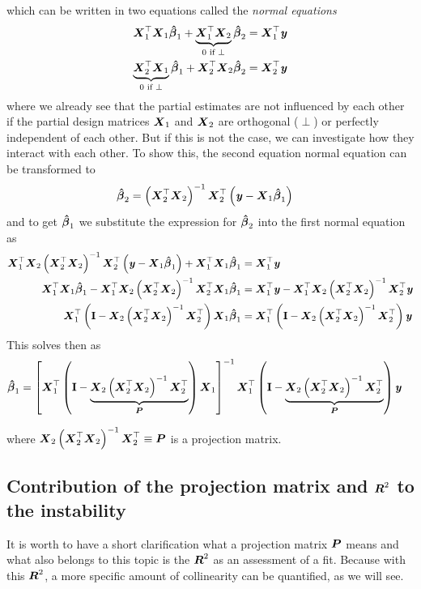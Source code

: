 \documentclass[11pt,a4paper,twoside]{book}\usepackage[]{graphicx}\usepackage[]{xcolor}
\begin{document}
which can be written in two equations called the \textit{normal equations}
\begin{align*}
\X_1^\top \X_1 \hbbeta_1+\underbrace{\X_1^\top \X_2}_{0\text{ if }\perp}\hbbeta_2 &= \X_1^\top \y\\
\underbrace{\X_2^\top \X_1}_{0\text{ if }\perp}\hbbeta_1+\X_2^\top \X_2\hbbeta_2&= \X_2^\top \y
\end{align*}
where we already see that the partial estimates are not influenced by each other if the partial design matrices $\X_1$ and $\X_2$ are orthogonal ($\perp$) or perfectly independent of each other. But if this is not the case, we can investigate how they interact with each other. To show this, the second equation normal equation can be transformed to
\begin{align*}
\hbbeta_2&= \left(\X_2^\top \X_2\right)^{-1}\X_2^\top\left(\y-\X_1\hbbeta_1\right)
\end{align*}
and to get $\hbbeta_1$ we substitute the expression for $\hbbeta_2$ into the first normal equation as
\begin{align*}
\X_1^\top \X_2\left(\X_2^\top \X_2\right)^{-1}\X_2^\top\left(\y-\X_1\hbbeta_1\right)+\X_1^\top \X_1\hbbeta_1&= \X_1^\top \y\\
\X_1^\top \X_1\hbbeta_1-\X_1^\top \X_2\left(\X_2^\top \X_2\right)^{-1}\X_2^\top\X_1\hbbeta_1&= \X_1^\top \y-\X_1^\top \X_2\left(\X_2^\top \X_2\right)^{-1}\X_2^\top\y\\
\X_1^\top\left(\I-\X_2\left(\X_2^\top \X_2\right)^{-1}\X_2^\top\right)\X_1\hbbeta_1&=\X_1^\top\left(\I-\X_2\left(\X_2^\top \X_2\right)^{-1}\X_2^\top\right)\y
\end{align*}
This solves then as
\begin{align}
\hbbeta_1&=\left[\X_1^\top\left(\I-\underbrace{\X_2\left(\X_2^\top \X_2\right)^{-1}\X_2^\top}_{\bP}\right)\X_1\right]^{-1} \X_1^\top\left(\I-\underbrace{\X_2\left(\X_2^\top \X_2\right)^{-1}\X_2^\top}_{\bP}\right)\y \label{eq:parest}
\end{align}

where $\X_2\left(\X_2^\top \X_2\right)^{-1}\X_2^\top\equiv\bP$ is a projection matrix. 

\subsection*{Contribution of the projection matrix and $\bR^2$ to the instability}{\label{sec:rsquared}}

It is worth to have a short clarification what a projection matrix $\bP$ means and what also belongs to this topic is the $\bR^2$ as an assessment of a fit. Because with this $\bR^2$, a more specific amount of collinearity can be quantified, as we will see.
\end{document}
